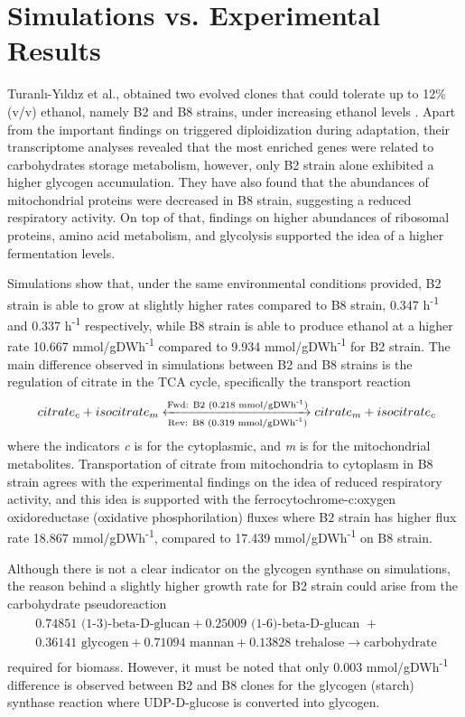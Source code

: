 \section{Simulations vs. Experimental Results}
Turanlı-Yıldız et al., obtained two evolved clones that could tolerate up to 12\% (v/v) ethanol, namely B2 and B8 strains, under increasing ethanol levels \cite{TuranlYldz2017}. Apart from the important findings on triggered diploidization during adaptation, their transcriptome analyses revealed that the most enriched genes were related to carbohydrates storage metabolism, however, only B2 strain alone exhibited a higher glycogen accumulation. They have also found that the abundances of mitochondrial proteins were decreased in B8 strain, suggesting a reduced respiratory activity. On top of that, findings on higher abundances of ribosomal proteins, amino acid metabolism, and glycolysis supported the idea of a higher fermentation levels.

Simulations show that, under the same environmental conditions provided, B2 strain is able to grow at slightly higher rates compared to B8 strain, 0.347 h\textsuperscript{-1} and 0.337 h\textsuperscript{-1} respectively, while B8 strain is able to produce ethanol at a higher rate 10.667 mmol/gDWh\textsuperscript{-1} compared to 9.934 mmol/gDWh\textsuperscript{-1} for B2 strain. The main difference observed in simulations between B2 and B8 strains is the regulation of citrate in the TCA cycle, specifically the transport reaction
\begin{align}
\label{eq:citratetransport}
\ citrate_c + isocitrate_m \xleftrightarrow[\text{Rev: B8 (0.319 mmol/gDWh\textsuperscript{-1})}]{\text{Fwd: B2 (0.218 mmol/gDWh\textsuperscript{-1})}} citrate_m + isocitrate_c
\end{align}
\noindent where the indicators \emph{c} is for the cytoplasmic, and \emph{m} is for the mitochondrial metabolites. Transportation of citrate from mitochondria to cytoplasm in B8 strain agrees with the experimental findings on the idea of reduced respiratory activity, and this idea is supported with the ferrocytochrome-c:oxygen oxidoreductase (oxidative phosphorilation) fluxes where B2 strain has higher flux rate 18.867 mmol/gDWh\textsuperscript{-1}, compared to 17.439 mmol/gDWh\textsuperscript{-1} on B8 strain.

Although there is not a clear indicator on the glycogen synthase on simulations, the reason behind a slightly higher growth rate for B2 strain could arise from the carbohydrate pseudoreaction
\begin{align}
\begin{split}
\  0.74851 \text{ (1-3)-beta-D-glucan} + 0.25009 \text{ (1-6)-beta-D-glucan } + \\
\ 0.36141 \text{ glycogen} + 0.71094 \text{ mannan} + 0.13828 \text{ trehalose} \xrightarrow{}  \text{carbohydrate}
\end{split}
\end{align}
required for biomass. However, it must be noted that only 0.003 mmol/gDWh\textsuperscript{-1} difference is observed between B2 and B8 clones for the glycogen (starch) synthase reaction where UDP-D-glucose is converted into glycogen.

